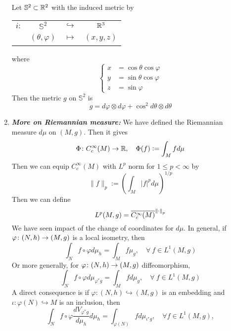 \begin{enumerate}[label=\arabic{*}.]
	\begin{exam}\label{exam:spheremetric}
		Let $\mathbb{S}^2 \subset \mathbb{R}^2$ with the induced metric by 
		\begin{center}
			\begin{tabular}{cccc}
				$i \colon$ & $\mathbb{S}^2$ & $\hookrightarrow$ & $\mathbb{R}^3$ \\
				~& $(\theta,\varphi)$ & $\mapsto$ & $(x,y,z)$
			\end{tabular}
		\end{center}
		where
		\begin{equation*}
			\left \{
				\begin{aligned}
					x &= \cos \theta \cos \varphi \\
					y &= \sin \theta \cos \varphi \\
					z &= \sin \varphi
				\end{aligned}
			\right.
		\end{equation*}
		Then the metric $g$ on $\mathbb{S}^2$ is
		\begin{equation*}
			g = d\varphi \otimes d\varphi + \cos^2 d\theta \otimes d\theta
		\end{equation*}
	\end{exam}

	\item {\emph{\textbf{More on Riemannian measure:}}} We have defined the Riemannian measure $d\mu$ on $(M,g)$. Then it gives
	\begin{equation*}
		\Phi \colon C_c^\infty(M) \rightarrow \mathbb{R},\quad \Phi(f) \vcentcolon= \int_M f d\mu
	\end{equation*}
	Then we can equip $C_c^\infty(M)$ with $L^p$ norm for $1 \leq p < \infty$ by
	\begin{equation*}
		\|f\|_{p}:=\left(\int_M|f|^p d \mu\right)^{1 / p}
	\end{equation*}
	Then we can define
	\begin{equation*}
		L^p(M,g) = \overline{C_c^\infty(M)}^{\left\lVert\cdot\right\lVert_p}
	\end{equation*}
	We have seen impact of the change of coordinates for $d\mu$. In general, if $\varphi \colon (N,h) \rightarrow (M,g)$ is a local isometry, then
	\begin{equation*}
		\int_N f \circ \varphi d\mu_h = \int_M f \mu_g,\quad \forall~f \in L^1(M,g)
	\end{equation*}
	Or more generally, for $\varphi \colon (N,h) \rightarrow (M,g)$ diffeomorphism,
	\begin{equation*}
		\int_N f \circ \varphi d\mu_{\varphi^*g} = \int_M f d\mu_g,\quad \forall~f \in L^1(M,g)
	\end{equation*}
	A direct consequence is if $\varphi \colon (N,h) \hookrightarrow (M,g)$ is an embedding and $\iota \colon \varphi(N) \hookrightarrow M$ is an inclusion, then
	\begin{equation*}
		\int_N f \circ \varphi \frac{d V_{\varphi^* g}}{d \mu_h} d \mu_h=\int_{\varphi(N)} f d \mu_{\iota^* g}, \quad \forall f \in L^1(M, g),
	\end{equation*}


\end{enumerate}
